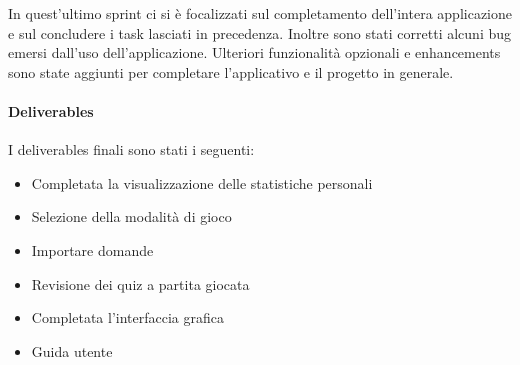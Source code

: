 In quest'ultimo sprint ci si è focalizzati sul completamento dell'intera applicazione e sul concludere i task lasciati in precedenza. Inoltre sono stati corretti alcuni bug emersi dall'uso dell'applicazione. Ulteriori funzionalità opzionali e enhancements sono state aggiunti per completare l'applicativo e il progetto in generale.
\paragraph{Deliverables} 
I deliverables finali sono stati i seguenti:
\begin{itemize}
    \item Completata la visualizzazione delle statistiche personali
    \item Selezione della modalità di gioco
    \item Importare domande
    \item Revisione dei quiz a partita giocata
    \item Completata l'interfaccia grafica
    \item Guida utente
\end{itemize}
